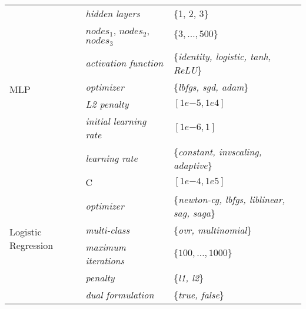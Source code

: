 {\begin{table}[!t]
{\begin{tabular}{p{2.5cm}lp{4.5cm}}
    \multirow{7}{1cm}{MLP} & \textit{hidden layers} & \{1, 2, 3\}\\
    \cline{2-3}
    & $\textit{nodes}_1$, $\textit{nodes}_2$, $\textit{nodes}_3$ & $\{3, \dotsc, 500\}$\\
    \cline{2-3}
    & \textit{activation function} & \{\textit{identity, logistic, tanh, ReLU}\}\\
    \cline{2-3}
    & \textit{optimizer} & \{\textit{lbfgs, sgd, adam}\}\\
    \cline{2-3}
    & \textit{L2 penalty} & $[1e\mathrm{-5}, 1e\mathrm{4}]$\\
    \cline{2-3}
    & \textit{initial learning rate} & $[1e\mathrm{-6}, 1]$\\
    \cline{2-3}
    & \textit{learning rate} & \{\textit{constant, invscaling, adaptive}\}\\
     \hline

    \multirow{6}{*}{Logistic Regression}& C & $[1e\mathrm{-4}, 1e\mathrm{5}]$ \\
    \cline{2-3}
    & \textit{optimizer} & \{\textit{newton-cg, lbfgs, liblinear, sag, saga}\} \\
    \cline{2-3}
    & \textit{multi-class} & \{\textit{ovr, multinomial}\} \\
    \cline{2-3}
    & \textit{maximum iterations} & $\{100, \dotsc, 1000\}$ \\
    \cline{2-3}
    & \textit{penalty} & \{\textit{l1, l2}\} \\
    \cline{2-3}
    & \textit{dual formulation} & \{\textit{true, false}\} \\
    \cline{2-3}
    \hline
    \end{tabular}}
\end{table}
}
